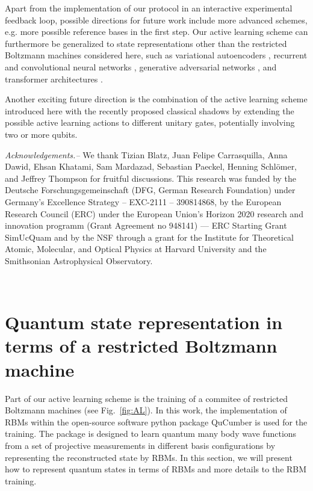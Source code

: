 \documentclass[pra,aps,showpacs,groupedaddress,superscriptaddress,twocolumn,toc=flat,biblatex,footinbib]{revtex4-1}
\begin{document}
Apart from the implementation of our protocol in an interactive experimental feedback loop, possible directions for future work include more advanced schemes, e.g. more possible reference bases in the first step. Our active learning scheme can furthermore be generalized to state representations other than the restricted Boltzmann machines considered here, such as variational autoencoders \cite{Rocchetto2018}, recurrent \cite{Morawetz2021} and convolutional neural networks \cite{Schmale2021}, generative adversarial networks \cite{Ahmed2021}, and transformer architectures \cite{Cha2021}.


Another exciting future direction is the combination of the active learning scheme introduced here with the recently proposed classical shadows \cite{Huang2020} by extending the possible active learning actions to different unitary gates, potentially involving two or more qubits.  




\emph{Acknowledgements.--}
We thank Tizian Blatz, Juan Felipe Carrasquilla, Anna Dawid, Ehsan Khatami, Sam Mardazad, Sebastian Paeckel, Henning Schlömer, and Jeffrey Thompson for fruitful discussions. This research was funded by the Deutsche Forschungsgemeinschaft (DFG, German Research Foundation) under Germany's Excellence Strategy -- EXC-2111 -- 390814868, by the European Research Council (ERC) under the European Union’s Horizon 2020 research and innovation programm (Grant Agreement no 948141) — ERC Starting Grant SimUcQuam and by the NSF through a grant for the Institute for Theoretical Atomic, Molecular, and Optical Physics at Harvard University and the Smithsonian Astrophysical Observatory.







\newpage~

\appendix 
\section{Quantum state representation in terms of a restricted Boltzmann machine \label{appendix:RBM}}
Part of our active learning scheme is the training of a commitee of restricted Boltzmann machines (see Fig.~\ref{fig:AL}). In this work, the implementation of RBMs within the open-source software python package QuCumber \cite{Qucumber2019} is used for the training. The package is designed to learn quantum many body wave functions from a set of projective measurements in different basis configurations by representing the reconstructed state by RBMs. In this section, we will present how to represent quantum states in terms of RBMs and more details to the RBM training.\\
\end{document}
